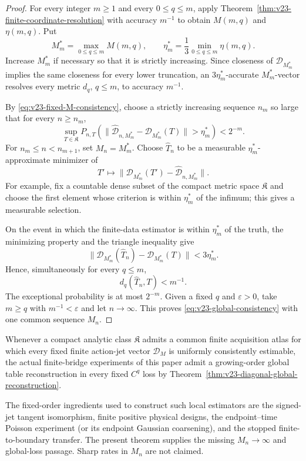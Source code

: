 \begin{proof}
For every integer \(m\ge1\) and every \(0\le q\le m\), apply
Theorem~\ref{thm:v23-finite-coordinate-resolution} with accuracy \(m^{-1}\)
to obtain \(M(m,q)\) and \(\eta(m,q)\).  Put
\begin{equation}\label{eq:v23-diagonal-M-eta}
 M_m^*=\max_{0\le q\le m}M(m,q),
 \qquad
 \eta_m^*=\frac13\min_{0\le q\le m}\eta(m,q).
\end{equation}
Increase \(M_m^*\) if necessary so that it is strictly increasing.  Since
closeness of \(\mathcal D_{M_m^*}\) implies the same closeness for every lower
truncation, an \(3\eta_m^*\)-accurate \(M_m^*\)-vector resolves every metric
\(d_q\), \(q\le m\), to accuracy \(m^{-1}\).

By \eqref{eq:v23-fixed-M-consistency}, choose a strictly increasing sequence
\(n_m\) so large that for every \(n\ge n_m\),
\begin{equation}\label{eq:v23-diagonal-prob}
 \sup_{T\in\mathfrak K}
 P_{n,T}\!\left(
   \|\widehat{\mathcal D}_{n,M_m^*}-
      \mathcal D_{M_m^*}(T)\|>\eta_m^*
 \right)<2^{-m}.
\end{equation}
For \(n_m\le n<n_{m+1}\), set \(M_n=M_m^*\).  Choose
\(\widehat T_n\) to be a measurable \(\eta_m^*\)-approximate minimizer of
\[
 T'\longmapsto
 \|\mathcal D_{M_m^*}(T')-
        \widehat{\mathcal D}_{n,M_m^*}\|.
\]
For example, fix a countable dense subset of the compact metric space
\(\mathfrak K\) and choose the first element whose criterion is within
\(\eta_m^*\) of the infimum; this gives a measurable selection.

On the event in which the finite-data estimator is within \(\eta_m^*\) of the
truth, the minimizing property and the triangle inequality give
\[
 \|\mathcal D_{M_m^*}(\widehat T_n)-
        \mathcal D_{M_m^*}(T)\|<3\eta_m^*.
\]
Hence, simultaneously for every \(q\le m\),
\[
                         d_q(\widehat T_n,T)<m^{-1}.
\]
The exceptional probability is at most \(2^{-m}\).  Given a fixed \(q\) and
\(\varepsilon>0\), take \(m\ge q\) with \(m^{-1}<\varepsilon\) and let
\(n\to\infty\).  This proves \eqref{eq:v23-global-consistency} with one
common sequence \(M_n\).
\end{proof}

\begin{corollary}
\label{cor:v23-physical-global-bridge}
Whenever a compact analytic class \(\mathfrak K\) admits a common finite
acquisition atlas for which every fixed finite action-jet vector
\(\mathcal D_M\) is uniformly consistently estimable, the actual finite-bridge
experiments of this paper admit a growing-order global table reconstruction in
every fixed \(C^q\) loss by
Theorem~\ref{thm:v23-diagonal-global-reconstruction}.

The fixed-order ingredients used to construct such local estimators are the
signed-jet tangent isomorphism, finite positive physical designs, the
endpoint--time Poisson experiment (or its endpoint Gaussian coarsening), and
the stopped finite-to-boundary transfer.  The present theorem supplies the
missing \(M_n\to\infty\) and global-loss passage.  Sharp rates in \(M_n\) are
not claimed.
\end{corollary}

